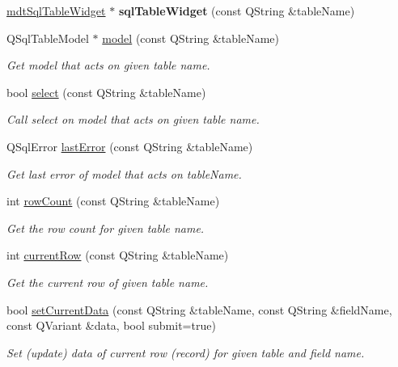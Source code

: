 \begin{DoxyCompactItemize}
\item 
\hypertarget{classmdt_sql_form_a6a17f32077fb7cc33139c3dc26a8d011}{
\hyperlink{classmdt_sql_table_widget}{mdtSqlTableWidget} $\ast$ {\bfseries sqlTableWidget} (const QString \&tableName)}
\label{classmdt_sql_form_a6a17f32077fb7cc33139c3dc26a8d011}

\item 
QSqlTableModel $\ast$ \hyperlink{classmdt_sql_form_ac3f257a2711f66b3cdd811804c0f11b0}{model} (const QString \&tableName)
\begin{DoxyCompactList}\small\item\em Get model that acts on given table name. \end{DoxyCompactList}\item 
bool \hyperlink{classmdt_sql_form_ae9a1f8c03e5ac8ccd01fa804356abd01}{select} (const QString \&tableName)
\begin{DoxyCompactList}\small\item\em Call select on model that acts on given table name. \end{DoxyCompactList}\item 
QSqlError \hyperlink{classmdt_sql_form_a1f6896b7e5aca10669bf17609c04e0af}{lastError} (const QString \&tableName)
\begin{DoxyCompactList}\small\item\em Get last error of model that acts on tableName. \end{DoxyCompactList}\item 
int \hyperlink{classmdt_sql_form_a7d50c271fc506764ed20dd88914d0ddc}{rowCount} (const QString \&tableName)
\begin{DoxyCompactList}\small\item\em Get the row count for given table name. \end{DoxyCompactList}\item 
int \hyperlink{classmdt_sql_form_a855de08e9ddb3f7898ef4ceb0b0331f9}{currentRow} (const QString \&tableName)
\begin{DoxyCompactList}\small\item\em Get the current row of given table name. \end{DoxyCompactList}\item 
bool \hyperlink{classmdt_sql_form_aa377e70f4a2e865b0b696957c0fca766}{setCurrentData} (const QString \&tableName, const QString \&fieldName, const QVariant \&data, bool submit=true)
\begin{DoxyCompactList}\small\item\em Set (update) data of current row (record) for given table and field name. \end{DoxyCompactList}\item 

\end{DoxyCompactItemize}

